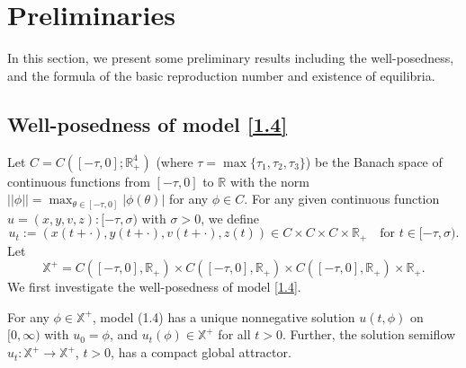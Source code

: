 \documentclass[reqno]{amsart}
\begin{document}
\section{Preliminaries}

In this section, we present some preliminary results including 
the well-posedness,  and the formula of
the basic reproduction number and existence of equilibria.


\subsection{Well-posedness of model \eqref{1.4}}

Let $C =C([-\tau,0];\mathbb{R}_{+}^{4})$ (where $\tau=\max \{\tau_1,\tau_2,\tau_3\}$) 
be the Banach space of continuous functions from $[-\tau, 0]$
to $\mathbb{R}$ with the norm $||\phi||=\max_{\theta\in [-\tau,0]}|\phi(\theta)|$ for 
any $\phi\in C$.
 For any given continuous function $u = (x, y, v, z): [-\tau,\sigma)$ with $\sigma>0$, 
we define
$$
u_t :=(x(t + \cdot), y(t + \cdot), v(t + \cdot), z(t))
\in C\times C\times C\times \mathbb{R}_+\quad \text{for  } t\in  [-\tau,\sigma).
$$
Let
$$
\mathbb{X}^+=C([-\tau,0], \mathbb{R}_+)\times C([-\tau,0], 
\mathbb{R}_+)\times C([-\tau,0], \mathbb{R}_+)\times \mathbb{R}_+.
$$
We first investigate the well-posedness of model \eqref{1.4}.

\begin{theorem}\label{T2.1}
For any $\phi \in \mathbb{X}^+ $, model (1.4) has a unique nonnegative solution 
$u(t,\phi)$  on $[0,\infty)$ with $u_0=\phi$, and $u_t(\phi)\in \mathbb{X}^+ $ for all
$t>0$.  Further, the solution semiflow $u_t: \mathbb{X}^+ \to \mathbb{X}^+$, $t>0$, 
has a compact global attractor.
\end{theorem}
\end{document}
